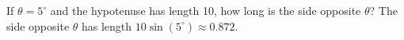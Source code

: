 {If $\theta = 5^{\circ}$ and the hypotenuse has length 10, how long is the side opposite $\theta$?}
{The side opposite $\theta$ has length $10\sin(5^{\circ}) \approx 0.872$.}
